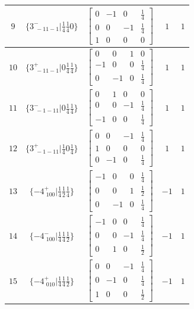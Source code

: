 \documentclass[fleqn,8pt]{jsarticle}
\begin{document}
\begin{longtable}{ccccc}
$ 9 $ & $ \{3^{-}_{\,\,-11-1}|\frac{1}{4} \frac{1}{4} 0\} $ & $ \begin{bmatrix} 0 & -1 & 0 & \frac{1}{4} \\ 0 & 0 & -1 & \frac{1}{4} \\ 1 & 0 & 0 & 0 \end{bmatrix} $ & $ 1 $ & $ 1 $ \\ \hline
$ 10 $ & $ \{3^{+}_{\,\,-11-1}|0 \frac{1}{4} \frac{1}{4}\} $ & $ \begin{bmatrix} 0 & 0 & 1 & 0 \\ -1 & 0 & 0 & \frac{1}{4} \\ 0 & -1 & 0 & \frac{1}{4} \end{bmatrix} $ & $ 1 $ & $ 1 $ \\ \hline
$ 11 $ & $ \{3^{-}_{\,\,-1-11}|0 \frac{1}{4} \frac{1}{4}\} $ & $ \begin{bmatrix} 0 & 1 & 0 & 0 \\ 0 & 0 & -1 & \frac{1}{4} \\ -1 & 0 & 0 & \frac{1}{4} \end{bmatrix} $ & $ 1 $ & $ 1 $ \\ \hline
$ 12 $ & $ \{3^{+}_{\,\,-1-11}|\frac{1}{4} 0 \frac{1}{4}\} $ & $ \begin{bmatrix} 0 & 0 & -1 & \frac{1}{4} \\ 1 & 0 & 0 & 0 \\ 0 & -1 & 0 & \frac{1}{4} \end{bmatrix} $ & $ 1 $ & $ 1 $ \\ \hline
$ 13 $ & $ \{-4^{+}_{\,\,100}|\frac{1}{4} \frac{1}{2} \frac{1}{4}\} $ & $ \begin{bmatrix} -1 & 0 & 0 & \frac{1}{4} \\ 0 & 0 & 1 & \frac{1}{2} \\ 0 & -1 & 0 & \frac{1}{4} \end{bmatrix} $ & $ -1 $ & $ 1 $ \\ \hline
$ 14 $ & $ \{-4^{-}_{\,\,100}|\frac{1}{4} \frac{1}{4} \frac{1}{2}\} $ & $ \begin{bmatrix} -1 & 0 & 0 & \frac{1}{4} \\ 0 & 0 & -1 & \frac{1}{4} \\ 0 & 1 & 0 & \frac{1}{2} \end{bmatrix} $ & $ -1 $ & $ 1 $ \\ \hline
$ 15 $ & $ \{-4^{+}_{\,\,010}|\frac{1}{4} \frac{1}{4} \frac{1}{2}\} $ & $ \begin{bmatrix} 0 & 0 & -1 & \frac{1}{4} \\ 0 & -1 & 0 & \frac{1}{4} \\ 1 & 0 & 0 & \frac{1}{2} \end{bmatrix} $ & $ -1 $ & $ 1 $ \\ \hline

\end{longtable}
\end{document}
